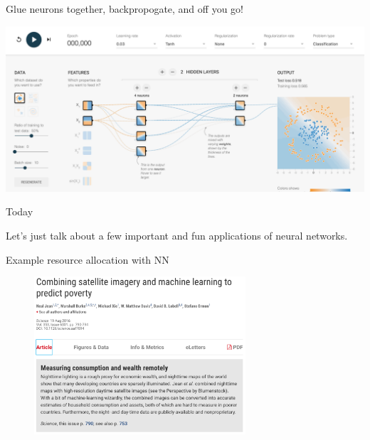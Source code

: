 \documentclass[mathserif, aspectratio=169]{beamer}
\begin{document}
\begin{frame}{Glue neurons together, backpropogate, and off you go!}
    
\includegraphics[width = \textwidth]{tensorflow.pdf}

\end{frame}

\begin{frame}{Today}
    
Let's just talk about a few important and fun applications of neural networks.  

\end{frame}

\begin{frame}{Example resource allocation with NN}
\begin{figure}
\includegraphics[width=0.7\textwidth]{jean_header}
\caption*{}
\end{figure}
\end{frame}
\end{document}
